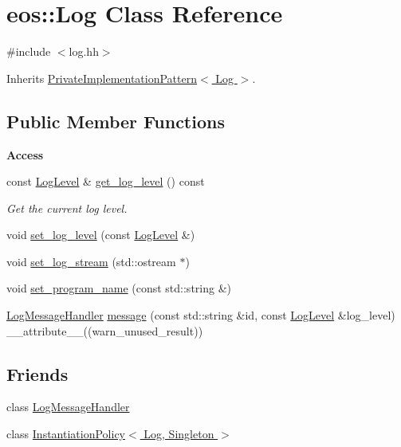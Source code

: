 \hypertarget{classeos_1_1Log}{
\section{eos::Log Class Reference}
\label{classeos_1_1Log}
}


{\ttfamily \#include $<$log.hh$>$}

Inherits \hyperlink{classeos_1_1PrivateImplementationPattern}{PrivateImplementationPattern$<$ Log $>$}.\subsection*{Public Member Functions}
\begin{Indent}{\bf Access}\par
{\em \label{_amgrpbf733d8a933c1601697f364223fc7ecb}
 }\begin{DoxyCompactItemize}
\item 
const \hyperlink{namespaceeos_ad6b42a08a08a1b63498f3f262bd15602}{LogLevel} \& \hyperlink{classeos_1_1Log_aada216ea65e76bb02481c587c2467e93}{get\_\-log\_\-level} () const 
\begin{DoxyCompactList}\small\item\em Get the current log level. \item\end{DoxyCompactList}\item 
void \hyperlink{classeos_1_1Log_a7aebea877e1c2a3d185f0967719b89c7}{set\_\-log\_\-level} (const \hyperlink{namespaceeos_ad6b42a08a08a1b63498f3f262bd15602}{LogLevel} \&)
\item 
void \hyperlink{classeos_1_1Log_ad5f0046aaba91f5e60f16eeb43f76c0f}{set\_\-log\_\-stream} (std::ostream $\ast$)
\item 
void \hyperlink{classeos_1_1Log_aa0ba105aa2ad0914ce8c93d66f6e26de}{set\_\-program\_\-name} (const std::string \&)
\item 
\hyperlink{classeos_1_1LogMessageHandler}{LogMessageHandler} \hyperlink{classeos_1_1Log_a554d8b48664cf871f1fcddf52e6f8530}{message} (const std::string \&id, const \hyperlink{namespaceeos_ad6b42a08a08a1b63498f3f262bd15602}{LogLevel} \&log\_\-level) \_\-\_\-attribute\_\-\_\-((warn\_\-unused\_\-result))
\end{DoxyCompactItemize}
\end{Indent}
\subsection*{Friends}
\begin{DoxyCompactItemize}
\item 
class \hyperlink{classeos_1_1Log_ab9569a6854b96140aaafae85f5ce4097}{LogMessageHandler}
\item 
class \hyperlink{classeos_1_1Log_ac44bccc4d7bdab643d8143c8781ff698}{InstantiationPolicy$<$ Log, Singleton $>$}
\end{DoxyCompactItemize}
